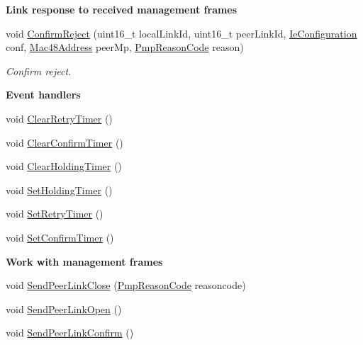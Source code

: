 \begin{Indent}{\bf Link response to received management frames}
\begin{DoxyCompactItemize}
void \hyperlink{classns3_1_1dot11s_1_1PeerLink_a8378fb3eb32c4dcfee9bc090777ba8de}{Confirm\+Reject} (uint16\+\_\+t local\+Link\+Id, uint16\+\_\+t peer\+Link\+Id, \hyperlink{classns3_1_1dot11s_1_1IeConfiguration}{Ie\+Configuration} conf, \hyperlink{classns3_1_1Mac48Address}{Mac48\+Address} peer\+Mp, \hyperlink{group__dot11s_ga1132ec5975c87960ceb86ea54481aba6}{Pmp\+Reason\+Code} reason)
\begin{DoxyCompactList}\small\item\em Confirm reject. \end{DoxyCompactList}\end{DoxyCompactItemize}
\end{Indent}
\begin{Indent}{\bf Event handlers}\par
\begin{DoxyCompactItemize}
\item 
void \hyperlink{classns3_1_1dot11s_1_1PeerLink_ae3f2f1d9e38f1aae12dcda017c4afc42}{Clear\+Retry\+Timer} ()
\item 
void \hyperlink{classns3_1_1dot11s_1_1PeerLink_a893c2266bae5bd222a406f5ca183f7d2}{Clear\+Confirm\+Timer} ()
\item 
void \hyperlink{classns3_1_1dot11s_1_1PeerLink_a8e61129229d61eb074964a6a24d5ed75}{Clear\+Holding\+Timer} ()
\item 
void \hyperlink{classns3_1_1dot11s_1_1PeerLink_a270a9aa7945fa680b2c03e5b5d20f3c0}{Set\+Holding\+Timer} ()
\item 
void \hyperlink{classns3_1_1dot11s_1_1PeerLink_a427403516dd5b94b100d6e924d230146}{Set\+Retry\+Timer} ()
\item 
void \hyperlink{classns3_1_1dot11s_1_1PeerLink_ab7f793f0d95207a35f9f670aa86ea414}{Set\+Confirm\+Timer} ()
\end{DoxyCompactItemize}
\end{Indent}
\begin{Indent}{\bf Work with management frames}\par
\begin{DoxyCompactItemize}
\item 
void \hyperlink{classns3_1_1dot11s_1_1PeerLink_a82b30e6a274ef9d033aafc69101620a2}{Send\+Peer\+Link\+Close} (\hyperlink{group__dot11s_ga1132ec5975c87960ceb86ea54481aba6}{Pmp\+Reason\+Code} reasoncode)
\item 
void \hyperlink{classns3_1_1dot11s_1_1PeerLink_a1ee0f0d4aa18659ed70b25c680add650}{Send\+Peer\+Link\+Open} ()
\item 
void \hyperlink{classns3_1_1dot11s_1_1PeerLink_ac215e2692e08500e26c6edee4b313a59}{Send\+Peer\+Link\+Confirm} ()
\end{DoxyCompactItemize}
\end{Indent}
